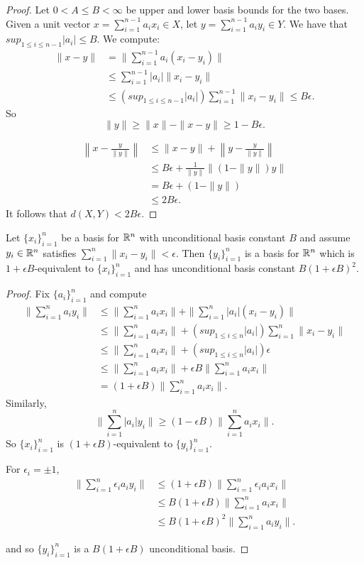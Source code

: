 \begin{proof}
Let $0<A\le B < \infty$ be upper and lower basis bounds for the two bases.
Given a unit vector $x=\sum_{i=1}^{n-1}a_ix_i\in X$, let $y=\sum_{i=1}^{n-1}a_iy_i\in Y$.
We have that $sup_{1\le i \le n-1}|a_i|\le B$.
We compute:
\begin{align*}
 \|x-y\|&=\|\sum_{i=1}^{n-1}a_i(x_i-y_i)\|\\
 &\le \sum_{i=1}^{n-1}|a_i|\|x_i-y_i\|\\
 &\le (sup_{1\le i \le n-1}|a_i|)\sum_{i=1}^{n-1}\|x_i-y_i\|\le B\epsilon.
 \end{align*}
 So
 \[\|y\|\ge \|x\|-\|x-y\|\ge 1-B\epsilon.
 \]

\begin{align*}
\left \|x-\frac{y}{\|y\|}\right \|&\le  \|x-y\|+\left \|y-\frac{y}{\|y\|}\right \|\\
&\le B\epsilon+\frac{1}{\|y\|}\|(1-\|y\|)y\|\\
&= B\epsilon+(1-\|y\|)\\
&\le 2B\epsilon.
\end{align*}
It follows that $d(X,Y)<2B\epsilon.$
\end{proof}

\begin{lemma}\label{L3}
Let $\{x_i\}_{i=1}^n$ be a basis for $\mathbb R^n$ with unconditional basis constant $B$ and assume $y_i\in \mathbb R^n$ satisfies
$\sum_{i=1}^n\|x_i-y_i\|<\epsilon.$ Then $\{y_i\}_{i=1}^n$ is a basis for $\mathbb R^n$ which is $1+\epsilon B$-equivalent
to $\{x_i\}_{i=1}^n$ and has unconditional basis constant $B(1+\epsilon B)^2$.
\end{lemma}

\begin{proof}
Fix $\{a_i\}_{i=1}^n$ and compute
\begin{align*}
\|\sum_{i=1}^na_iy_i\|&\le \|\sum_{i=1}^na_ix_i\|+\|\sum_{i=1}^n|a_i|(x_i-y_i)\|\\
&\le \|\sum_{i=1}^na_ix_i\|+(sup_{1\le i \le n}|a_i|)\sum_{i=1}^n\|x_i-y_i\|\\
&\le \|\sum_{i=1}^na_ix_i\|+(sup_{1\le i \le n}|a_i|)\epsilon\\
&\le \|\sum_{i=1}^na_ix_i\|+\epsilon B\|\sum_{i=1}^na_ix_i\|\\
& = (1+\epsilon B)\|\sum_{i=1}^na_ix_i\|.
\end{align*}
Similarly,
\[ \|\sum_{i=1}^n|a_i|y_i\|\ge (1-\epsilon B)\|\sum_{i=1}^na_ix_i\|.\]
So $\{x_i\}_{i=1}^n$ is $(1+\epsilon B)$-equivalent to $\{y_i\}_{i=1}^n$.

For $\epsilon_i = \pm1$,
\begin{align*}
 \|\sum_{i=1}^n\epsilon_ia_iy_i\|&\le (1+\epsilon B)\|\sum_{i=1}^n\epsilon_ia_ix_i\|\\
 &\le B(1+\epsilon B)\|\sum_{i=1}^na_ix_i\|\\
 &\le B(1+\epsilon B)^2\|\sum_{i=1}^na_iy_i\|.
\end{align*}

 and so $\{y_i\}_{i=1}^n$ is a $B(1+\epsilon B)$
unconditional basis.
\end{proof}

